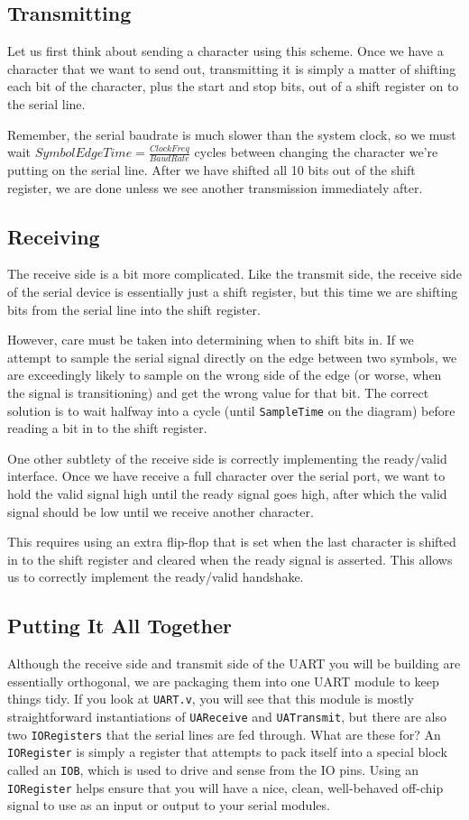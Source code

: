 \documentclass[11pt]{article}
\begin{document}
\subsection{Transmitting}
Let us first think about sending a character using this scheme. Once we have a character that we want to send out, transmitting it is simply a matter of shifting each bit of the character, plus the start and stop bits, out of a shift register on to the serial line. 

Remember, the serial baudrate is much slower than the system clock, so we must wait $SymbolEdgeTime = \frac{ClockFreq}{BaudRate}$ cycles between changing the character we're putting on the serial line. After we have shifted all 10 bits out of the shift register, we are done unless we see another transmission immediately after.

\subsection{Receiving}
The receive side is a bit more complicated. Like the transmit side, the receive side of the serial device is essentially just a shift register, but this time we are shifting bits from the serial line into the shift register.

However, care must be taken into determining when to shift bits in. If we attempt to sample the serial signal directly on the edge between two symbols, we are exceedingly likely to sample on the wrong side of the edge (or worse, when the signal is transitioning) and get the wrong value for that bit. The correct solution is to wait halfway into a cycle (until \verb|SampleTime| on the diagram) before reading a bit in to the shift register.

One other subtlety of the receive side is correctly implementing the ready/valid interface. Once we have receive a full character over the serial port, we want to hold the valid signal high until the ready signal goes high, after which the valid signal should be low until we receive another character. 

This requires using an extra flip-flop that is set when the last character is shifted in to the shift register and cleared when the ready signal is asserted. This allows us to correctly implement the ready/valid handshake.

\subsection{Putting It All Together}
Although the receive side and transmit side of the UART you will be building are essentially orthogonal, we are packaging them into one UART module to keep things tidy. If you look at \verb|UART.v|, you will see that this module is mostly straightforward instantiations of \verb|UAReceive| and \verb|UATransmit|, but there are also two \verb|IORegisters| that the serial lines are fed through. What are these for? An \verb|IORegister| is simply a register that attempts to pack itself into a special block called an \verb|IOB|, which is used to drive and sense from the IO pins. Using an \verb|IORegister| helps ensure that you will have a nice, clean, well-behaved off-chip signal to use as an input or output to your serial modules.
\end{document}
